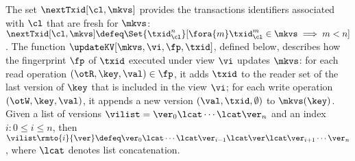 The set $\nextTxid[\cl, \mkvs]$ provides the transactions identifiers
associated with $\cl$ that are fresh for  $\mkvs$:
\(
\nextTxid[\cl, \mkvs] \defeq 
\Set{\txid_{\cl}^{n}}[%
\fora{m} \txid_{\cl}^{m} \in \mkvs \implies m < n ]
\).
The function $\updateKV[\mkvs, \vi, \fp, \txid]$, defined below, 
describes how the fingerprint $\fp$ of $\txid$ executed under view $\vi$ updates $\mkvs$:
for each read operation $(\otR, \key, \val) \in \fp$, it adds $\txid$ 
to the reader set of the last version of $\key$ that is included in the view $\vi$; 
for each write operation $(\otW, \key, \val)$, it appends a new version $(\val, \txid, \emptyset)$ 
to $\mkvs(\key)$. 
Given a list of versions $\vilist = \ver_0 \lcat \cdots \lcat \ver_n$ 
and an index $i: 0 \leq i \leq n$, 
then $\vilist\rmto{i}{\ver} \defeq \ver_0 \lcat \cdots \lcat \ver_{i-1} \lcat \ver \lcat \ver_{i+1} \cdots \ver_{n}$,
where $\lcat$ denotes list concatenation. 

